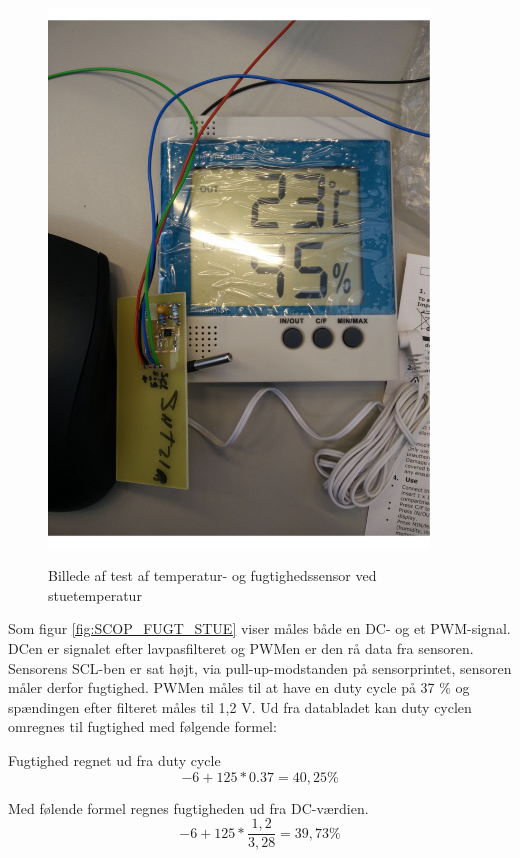 \begin{figure}[H]
\centering
{\includegraphics[width=0.90\textwidth]{filer/modultest/Billeder/test_STUE}}
\caption{Billede af test af temperatur- og fugtighedssensor ved stuetemperatur}
\label{lab:TEST_STUE}
\end{figure}



Som figur \ref{fig:SCOP_FUGT_STUE} viser måles både en DC- og et PWM-signal. DCen er signalet efter lavpasfilteret og PWMen er den rå data fra sensoren. 
Sensorens SCL-ben er sat højt, via pull-up-modstanden på sensorprintet, sensoren måler derfor fugtighed. PWMen måles til at have en duty cycle på 37 \% og spændingen efter filteret måles til 1,2 V. Ud fra databladet kan duty cyclen omregnes til fugtighed med følgende formel:

Fugtighed regnet ud fra duty cycle
\begin{equation}
-6+125*0.37=40,25\%
\end{equation}

Med følende formel regnes fugtigheden ud fra DC-værdien.
\begin{equation}
-6+125*\frac{1,2}{3,28}= 39,73\%
\end{equation}

